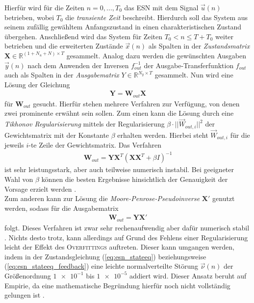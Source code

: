 Hierfür wird für die Zeiten $n=0, ..., T_0$ das \textsc{ESN} mit dem Signal $\vec{u}(n)$ betrieben, wobei $T_0$ die \textit{transiente Zeit} beschreibt. Hierdurch soll das System aus seinem zufällig gewähltem Anfangszustand in einen charakteristischen Zustand übergehen. Anschließend wird das System für Zeiten $T_0 < n \leq T+ T_0$ weiter betrieben und die erweiterten Zustände $\vec{x}(n)$ als Spalten in der \textit{Zustandsmatrix} $\mathbf{X} \in \mathbb{R}^{(1 + N_u + N) \times T}$ gesammelt. Analog dazu werden die gewünschten Ausgaben $\vec{y}(n)$ nach dem Anwenden der Inversen $f^{-1}_{out}$ der Ausgabe-Transferfunktion $f_{out}$ auch als Spalten in der \textit{Ausgabematrix} $Y \in \mathbb{R}^{N_y \times T}$ gesammelt.
Nun wird eine Lösung der Gleichung
\begin{align}
\mathbf{Y} = \mathbf{W}_{out} \mathbf{X}
\end{align}
für $\mathbf{W}_{out}$ gesucht. Hierfür stehen mehrere Verfahren zur Verfügung, von denen zwei prominente erwähnt sein sollen.
Zum einen kann die Lösung durch eine \textit{Tikhonov Regularisierung} mittels der Regularisierung $\beta \cdot ||\vec{W}_{out, i}||^2$ der Gewichtsmatrix mit der Konstante $\beta$ erhalten werden. Hierbei steht $\vec{W}_{out, i}$ für die jeweils $i$-te Zeile der Gewichtsmatrix. Das Verfahren
\begin{align}
\label{eq:tikhonov}
\mathbf{W}_{out} = \mathbf{Y} \mathbf{X}^T \left(\mathbf{X} \mathbf{X}^T + \beta I \right)^{-1}
\end{align}
ist sehr leistungsstark, aber auch teilweise numerisch instabil. Bei geeigneter Wahl von $\beta$ können die besten Ergebnisse hinsichtlich der Genauigkeit der Vorsage erzielt werden \cite{lukoseviciusa2009}.\\

Zum anderen kann zur Lösung die \textit{Moore-Penrose-Pseudoinverse} $\mathbf{X}'$ genutzt werden, sodass für die Ausgabematrix
\begin{align}
\label{eq:pseudo_inverse}
\mathbf{W}_{out} = \mathbf{Y} \mathbf{X}'
\end{align}
folgt. Dieses Verfahren ist zwar sehr rechenaufwendig aber dafür numerisch stabil \cite{lukoseviciusa2009, jaeger2012}. Nichts desto trotz, kann allerdings auf Grund des Fehlens einer Regularisierung leicht der Effekt des \textsc{Overfittings} auftreten. Dieser kann umgangen werden, indem in der Zustandsgleichung (\ref{eq:esn_stateeq}) beziehungsweise (\ref{eq:esn_stateeq_feedback}) eine leichte normalverteilte Störung $\vec{\nu}(n)$ der Größenordnung $\num{1e-1}$ bis $\num{1e-5}$ addiert wird. Dieser Ansatz beruht auf Empirie, da eine mathematische Begründung hierfür noch nicht vollständig gelungen ist \citep{jaeger2010, lukoseviciusa2009}.\\

